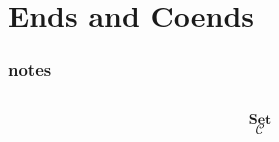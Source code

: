 \documentclass[DaoFP]{subfiles}
\begin{document}
\setcounter{chapter}{16}

\chapter{Ends and Coends}
\subsection{notes}


\begin{exercise}
\end{exercise}

\begin{haskell}
\end{haskell}

\[
 \begin{tikzcd}
  \end{tikzcd}
\]

\[   \mathbf{Set} \]
\[   \mathcal{C} \]
\end{document}
